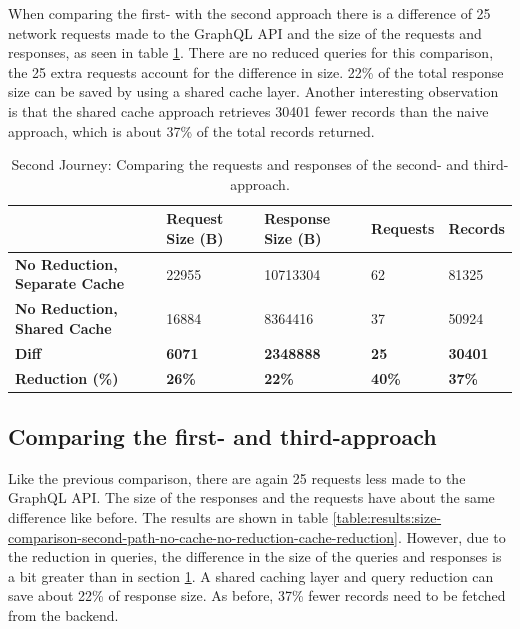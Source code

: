 When comparing the first- with the second approach there is a difference of 25 network requests made to the GraphQL \ac{API} and the size of the requests and responses, as seen in table \ref{table:results:size-comparison-second-path-cache-no-reduction-cache-reduction}. There are no reduced queries for this comparison, the 25 extra requests account for the difference in size. 22\% of the total response size can be saved by using a shared cache layer. Another interesting observation is that the shared cache approach retrieves 30401 fewer records than the naive approach, which is about 37\% of the total records returned.

\ifshowTables
\begin{table}[H]
  \begin{tabular}{|l|l|l|l|l|}
  \hline
  & \textbf{Request Size (B)} & \textbf{Response Size (B)} & \textbf{Requests} & \textbf{Records} \\
  \hline
  \textbf{No Reduction, Separate Cache} & 22955 & 10713304 & 62 & 81325 \\
  \hline
  \textbf{No Reduction, Shared Cache} & 16884 & 8364416 & 37 & 50924 \\
  \hline
  \hline
  \textbf{Diff} & \textbf{6071} & \textbf{2348888} & \textbf{25} & \textbf{30401} \\
  \hline
  \textbf{Reduction (\%)} & \textbf{26\%} & \textbf{22\%} & \textbf{40\%} & \textbf{37\%} \\
  \hline
  \end{tabular}
  \caption{Second Journey: Comparing the requests and responses of the second- and third-approach.}\label{table:results:size-comparison-second-path-cache-no-reduction-cache-reduction}
\end{table}
\fi

\subsection{Comparing the first- and third-approach}\label{subsection:results:comparison-second-path-second-third-approach}

Like the previous comparison, there are again 25 requests less made to the GraphQL \ac{API}. The size of the responses and the requests have about the same difference like before. The results are shown in table \ref{table:results:size-comparison-second-path-no-cache-no-reduction-cache-reduction}. However, due to the reduction in queries, the difference in the size of the queries and responses is a bit greater than in section \ref{table:results:size-comparison-second-path-cache-no-reduction-cache-reduction}. A shared caching layer and query reduction can save about 22\% of response size. As before, 37\% fewer records need to be fetched from the backend.

